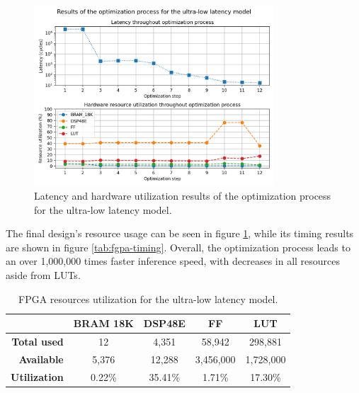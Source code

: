 \begin{figure}[hpt!]
  \centering
  \includegraphics[trim={0cm 0cm 0cm 1cm}, clip, width=0.8\textwidth, center]{../logs/hardware_optimizations.png}
  \caption{Latency and hardware utilization results of the optimization process for the ultra-low latency model.}
  \label{fig:hardware-optimizations}
\end{figure}

The final design's resource usage can be seen in figure \ref{tab:utilization}, while its timing results are shown in figure \ref{tab:fgpa-timing}. Overall, the optimization process leads to an over 1,000,000 times faster inference speed, with decreases in all resources aside from LUTs.

\begin{table}[hpt!]
  \centering
  \caption{FPGA resources utilization for the ultra-low latency model.}
  \label{tab:utilization}
  \bgroup
  \def\arraystretch{1.3}
  \setlength\tabcolsep{3mm}
  \begin{tabular}{r|c|c|c|c|}
  \cline{2-5}
  \multicolumn{1}{c|}{}                      & \textbf{BRAM 18K} & \textbf{DSP48E} & \textbf{FF} & \textbf{LUT} \\ \hline
  \multicolumn{1}{|r|}{\textbf{Total used}}       & 12                 & 4,351            & 58,942       & 298,881       \\ \hline
  \multicolumn{1}{|r|}{\textbf{Available}}   & 5,376              & 12,288           & 3,456,000     & 1,728,000      \\ \hline\hline
  \multicolumn{1}{|r|}{\textbf{Utilization}} & 0.22\%            & 35.41\%         & 1.71\%      & 17.30\%       \\ \hline
  \end{tabular}
  \egroup
\end{table}

